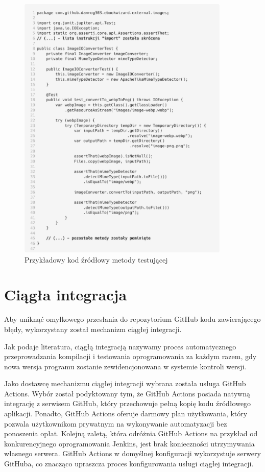 \begin{figure}[h]
    \centering
    \setlength{\fboxsep}{0pt}
    \setlength{\fboxrule}{0.4pt}
    \includegraphics[width=0.9\textwidth]{chap6/carbon_example_ut_code.png}
    \caption{Przykładowy kod źródłowy metody testującej}
    \label{list:carbon_example_ut_code}
\end{figure}


\section{Ciągła integracja}
\label{chapter:ci}

Aby uniknąć omyłkowego przesłania do repozytorium GitHub kodu zawierającego błędy, wykorzystany został mechanizm ciągłej integracji.

Jak podaje literatura, ciągłą integracją nazywamy proces automatycznego przeprowadzania kompilacji i testowania oprogramowania za każdym razem, gdy nowa wersja programu zostanie zewidencjonowana w systemie kontroli wersji. \cite{ci_book}

Jako dostawcę mechanizmu ciągłej integracji wybrana została usługa GitHub Actions. Wybór został podyktowany tym, że GitHub Actions posiada natywną integrację z serwisem GitHub, który przechowuje pełną kopię kodu źródłowego aplikacji. Ponadto, GitHub Actions oferuje darmowy plan użytkowania, który pozwala użytkownikom prywatnym na wykonywanie automatyzacji bez ponoszenia opłat. \cite{github_actions_docs} Kolejną zaletą, która odróżnia GitHub Actions na przykład od konkurencyjnego oprogramowania Jenkins, jest brak konieczności utrzymywania własnego serwera. GitHub Actions w domyślnej konfiguracji wykorzystuje serwery GitHuba, co znacząco upraszcza proces konfigurowania usługi ciągłej integracji. \cite{github_actions_docs, jenkins_docs} 


